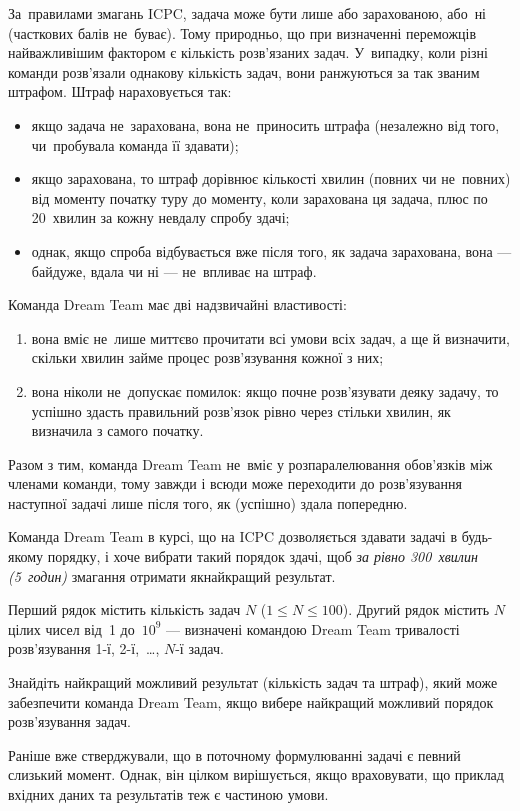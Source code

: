 ﻿За~правилами змагань ICPC, задача може бути лише або зарахованою, або~ні (часткових балів не~буває).
Тому природньо, що при визначенні переможців найважливішим фактором є кількість розв'язаних задач.
У~випадку, коли різні команди розв'язали однакову кількість задач, вони ранжуються за так званим штрафом.
Штраф нараховується так: 
\begin{itemize}
\item
якщо задача не~зарахована, вона не~приносить штрафа (незалежно від того, чи~пробувала команда її здавати);
\item
якщо зарахована, то штраф дорівнює кількості хвилин (повних чи не~повних) від моменту початку туру до моменту, коли зарахована ця задача, плюс по 20~хвилин за кожну невдалу спробу здачі;
\item
однак, якщо спроба відбувається вже після того, як задача зарахована, вона --- байдуже, вдала чи ні --- не~впливає на штраф. 
\end{itemize}
 
Команда Dream Team має дві надзвичайні властивості:
\begin{enumerate}
\item
вона вміє не~лише миттєво прочитати всі умови всіх задач, а ще й визначити, скільки хвилин займе процес розв'язування кожної з них;
\item
вона ніколи не~допускає помилок: якщо почне розв'язувати деяку задачу, то успішно здасть правильний розв'язок рівно через стільки хвилин, як визначила з самого початку.
\end{enumerate}

Разом з тим, команда Dream Team не~вміє у розпаралелювання обов'язків між членами команди, тому завжди і всюди може переходити до розв'язування наступної задачі лише після того, як (успішно) здала попередню.

Команда Dream Team в курсі, що на ICPC дозволяється здавати задачі в будь-якому порядку, і хоче вибрати такий порядок здачі, щоб {\it за рівно 300~хвилин (5~годин)} змагання отримати якнайкращий результат.

\InputFile
Перший рядок містить кількість задач $N$ ($1\leqslant N\leqslant 100$).
Др{\it у}гий рядок містить $N$ цілих чисел від~1 до~$10^{9}$ --- визначені командою Dream Team тривалості розв'язування {1-ї}, {2-ї},~\dots, {$N$-ї} задач.

\OutputFile
Знайдіть найкращий можливий результат (кількість задач та штраф), який може забезпечити команда Dream Team, якщо вибере найкращий можливий порядок розв'язування задач.

\Examples
\begin{example}
%
\end{example}

\Note
Раніше вже стверджували, що в поточному формулюванні задачі є певний слизький момент.
Однак, він цілком вирішується, якщо враховувати, що приклад вхідних даних та результатів теж є частиною умови.